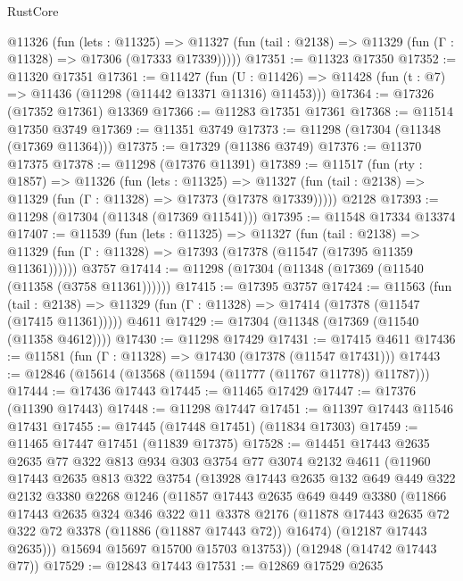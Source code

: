 \begin{lexlean}{RustCore}
\begin{coremodule}
    @11326
      (fun (lets : @11325) =>
      @11327 (fun (tail : @2138) => @11329 (fun (Γ : @11328) => @17306 (@17333 @17339)))))
@17351 := @11323 @17350
@17352 := @11320 @17351
@17361 := @11427
    (fun (U : @11426) => @11428 (fun (t : @7) => @11436 (@11298 (@11442 @13371 @11316) @11453)))
@17364 := @17326 (@17352 @17361) @13369
@17366 := @11283 @17351 @17361
@17368 := @11514 @17350 @3749
@17369 := @11351 @3749
@17373 := @11298 (@17304 (@11348 (@17369 @11364)))
@17375 := @17329 (@11386 @3749)
@17376 := @11370 @17375
@17378 := @11298 (@17376 @11391)
@17389 := @11517
    (fun (rty : @1857) =>
    @11326
      (fun (lets : @11325) =>
      @11327 (fun (tail : @2138) => @11329 (fun (Γ : @11328) => @17373 (@17378 @17339)))))
    @2128
@17393 := @11298 (@17304 (@11348 (@17369 @11541)))
@17395 := @11548 @17334 @13374
@17407 := @11539
    (fun (lets : @11325) =>
    @11327
      (fun (tail : @2138) =>
      @11329 (fun (Γ : @11328) => @17393 (@17378 (@11547 (@17395 @11359 @11361))))))
    @3757
@17414 := @11298 (@17304 (@11348 (@17369 (@11540 (@11358 (@3758 @11361))))))
@17415 := @17395 @3757
@17424 := @11563
    (fun (tail : @2138) => @11329 (fun (Γ : @11328) => @17414 (@17378 (@11547 (@17415 @11361)))))
    @4611
@17429 := @17304 (@11348 (@17369 (@11540 (@11358 @4612))))
@17430 := @11298 @17429
@17431 := @17415 @4611
@17436 := @11581 (fun (Γ : @11328) => @17430 (@17378 (@11547 @17431)))
@17443 := @12846 (@15614 (@13568 (@11594 (@11777 (@11767 @11778)) @11787)))
@17444 := @17436 @17443
@17445 := @11465 @17429
@17447 := @17376 (@11390 @17443)
@17448 := @11298 @17447
@17451 := @11397 @17443 @11546 @17431
@17455 := @17445 (@17448 @17451) (@11834 @17303)
@17459 := @11465 @17447 @17451 (@11839 @17375)
@17528 := @14451
    @17443
    @2635
    @2635
    @77
    @322
    @813
    @934
    @303
    @3754
    @77
    @3074
    @2132
    @4611
    (@11960
      @17443
      @2635
      @813
      @322
      @3754
      (@13928
        @17443
        @2635
        @132
        @649
        @449
        @322
        @2132
        @3380
        @2268
        @1246
        (@11857
          @17443
          @2635
          @649
          @449
          @3380
          (@11866
            @17443
            @2635
            @324
            @346
            @322
            @11
            @3378
            @2176
            (@11878 @17443 @2635 @72 @322 @72 @3378 (@11886 (@11887 @17443 @72)) @16474)
            (@12187 @17443 @2635)))
        @15694
        @15697
        @15700
        @15703
        @13753))
    (@12948 (@14742 @17443 @77))
@17529 := @12843 @17443
@17531 := @12869 @17529 @2635

\end{coremodule}
\end{lexlean}
